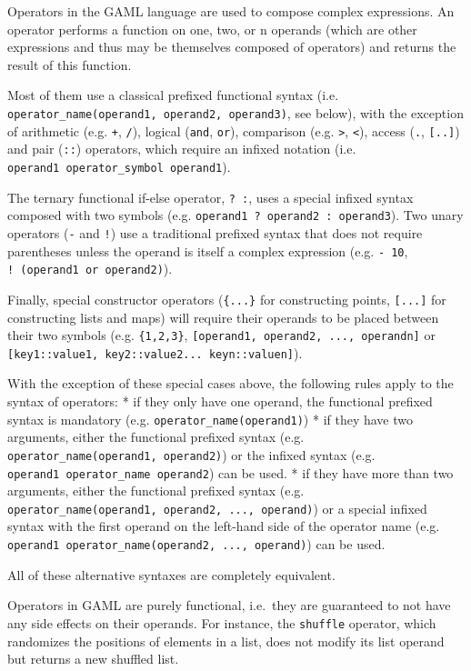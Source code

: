 \documentclass[]{book}
\theoremstyle{definition}
\theoremstyle{definition}
\theoremstyle{definition}
\theoremstyle{remark}
\begin{document}
Operators in the GAML language are used to compose complex expressions.
An operator performs a function on one, two, or n operands (which are
other expressions and thus may be themselves composed of operators) and
returns the result of this function.

Most of them use a classical prefixed functional syntax (i.e.
\texttt{operator\_name(operand1,\ operand2,\ operand3)}, see below),
with the exception of arithmetic (e.g. \texttt{+}, \texttt{/}), logical
(\texttt{and}, \texttt{or}), comparison (e.g. \texttt{\textgreater{}},
\texttt{\textless{}}), access (\texttt{.}, \texttt{{[}..{]}}) and pair
(\texttt{::}) operators, which require an infixed notation (i.e.
\texttt{operand1\ operator\_symbol\ operand1}).

The ternary functional if-else operator, \texttt{?\ :}, uses a special
infixed syntax composed with two symbols (e.g.
\texttt{operand1\ ?\ operand2\ :\ operand3}). Two unary operators
(\texttt{-} and \texttt{!}) use a traditional prefixed syntax that does
not require parentheses unless the operand is itself a complex
expression (e.g. \texttt{-\ 10}, \texttt{!\ (operand1\ or\ operand2)}).

Finally, special constructor operators (\texttt{\{...\}} for
constructing points, \texttt{{[}...{]}} for constructing lists and maps)
will require their operands to be placed between their two symbols (e.g.
\texttt{\{1,2,3\}}, \texttt{{[}operand1,\ operand2,\ ...,\ operandn{]}}
or \texttt{{[}key1::value1,\ key2::value2...\ keyn::valuen{]}}).

With the exception of these special cases above, the following rules
apply to the syntax of operators: * if they only have one operand, the
functional prefixed syntax is mandatory (e.g.
\texttt{operator\_name(operand1)}) * if they have two arguments, either
the functional prefixed syntax (e.g.
\texttt{operator\_name(operand1,\ operand2)}) or the infixed syntax
(e.g. \texttt{operand1\ operator\_name\ operand2}) can be used. * if
they have more than two arguments, either the functional prefixed syntax
(e.g. \texttt{operator\_name(operand1,\ operand2,\ ...,\ operand)}) or a
special infixed syntax with the first operand on the left-hand side of
the operator name (e.g.
\texttt{operand1\ operator\_name(operand2,\ ...,\ operand)}) can be
used.

All of these alternative syntaxes are completely equivalent.

Operators in GAML are purely functional, i.e.~they are guaranteed to not
have any side effects on their operands. For instance, the
\texttt{shuffle} operator, which randomizes the positions of elements in
a list, does not modify its list operand but returns a new shuffled
list.
\end{document}
